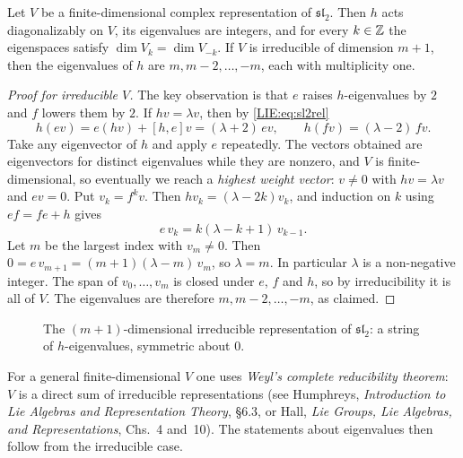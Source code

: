\begin{theorem}\label{LIE:thm:sl2}
Let $V$ be a finite-dimensional complex representation of $\mathfrak{sl}_2$. Then $h$ acts
diagonalizably on $V$, its eigenvalues are integers, and for every $k\in\mathbb{Z}$ the eigenspaces satisfy
$\dim V_k=\dim V_{-k}$. If $V$ is irreducible of dimension $m+1$, then the eigenvalues of $h$ are
$m,m-2,\dots,-m$, each with multiplicity one.
\end{theorem}

\begin{proof}[Proof for irreducible $V$]
The key observation is that $e$ raises $h$-eigenvalues by $2$ and $f$ lowers them by $2$. If
$hv=\lambda v$, then by \eqref{LIE:eq:sl2rel}
\[
  h(ev)=e(hv)+[h,e]v=(\lambda+2)\,ev,\qquad h(fv)=(\lambda-2)\,fv .
\]
Take any eigenvector of $h$ and apply $e$ repeatedly. The vectors obtained are eigenvectors for
distinct eigenvalues while they are nonzero, and $V$ is finite-dimensional, so eventually we reach a
\emph{highest weight vector}: $v\neq0$ with $hv=\lambda v$ and $ev=0$. Put $v_k=f^kv$. Then
$hv_k=(\lambda-2k)v_k$, and induction on $k$ using $ef=fe+h$ gives
\[
  e\,v_k=k(\lambda-k+1)\,v_{k-1}.
\]
Let $m$ be the largest index with $v_m\neq0$. Then $0=e\,v_{m+1}=(m+1)(\lambda-m)\,v_m$, so
$\lambda=m$. In particular $\lambda$ is a non-negative integer. The span of $v_0,\dots,v_m$ is closed
under $e$, $f$ and $h$, so by irreducibility it is all of $V$. The eigenvalues are therefore
$m,m-2,\dots,-m$, as claimed.
\end{proof}

\begin{figure}[ht]
\centering
{}
\caption{The $(m+1)$-dimensional irreducible representation of $\mathfrak{sl}_2$: a string of
$h$-eigenvalues, symmetric about $0$.}
\end{figure}

For a general finite-dimensional $V$ one uses \emph{Weyl's complete reducibility theorem}: $V$ is a
direct sum of irreducible representations (see Humphreys, \emph{Introduction to Lie Algebras and
Representation Theory}, \S6.3, or Hall, \emph{Lie Groups, Lie Algebras, and Representations}, Chs.~4 and~10).
The statements about eigenvalues then follow from the irreducible case.

